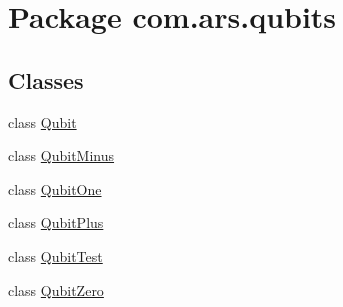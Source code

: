 \hypertarget{namespacecom_1_1ars_1_1qubits}{}\section{Package com.\+ars.\+qubits}
\label{namespacecom_1_1ars_1_1qubits}
\subsection*{Classes}
\begin{DoxyCompactItemize}
\item 
class \hyperlink{classcom_1_1ars_1_1qubits_1_1_qubit}{Qubit}
\item 
class \hyperlink{classcom_1_1ars_1_1qubits_1_1_qubit_minus}{Qubit\+Minus}
\item 
class \hyperlink{classcom_1_1ars_1_1qubits_1_1_qubit_one}{Qubit\+One}
\item 
class \hyperlink{classcom_1_1ars_1_1qubits_1_1_qubit_plus}{Qubit\+Plus}
\item 
class \hyperlink{classcom_1_1ars_1_1qubits_1_1_qubit_test}{Qubit\+Test}
\item 
class \hyperlink{classcom_1_1ars_1_1qubits_1_1_qubit_zero}{Qubit\+Zero}
\end{DoxyCompactItemize}
